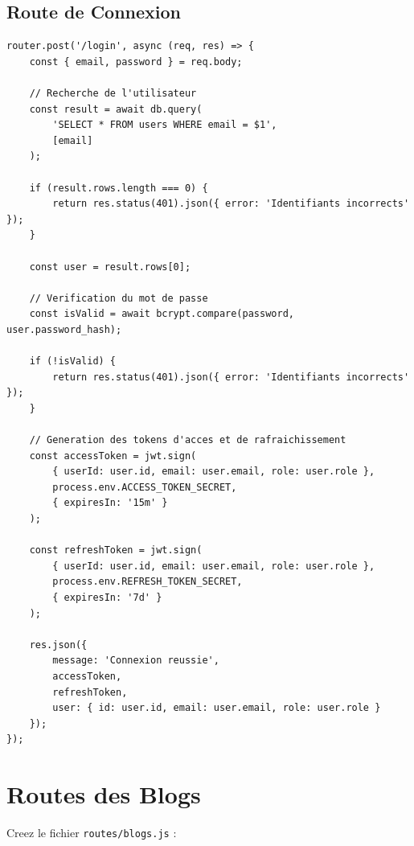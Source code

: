 \documentclass[a4paper,12pt]{book}
\begin{document}
\subsection{Route de Connexion}

\begin{lstlisting}[style=javascript, caption=POST /api/auth/login]
router.post('/login', async (req, res) => {
    const { email, password } = req.body;

    // Recherche de l'utilisateur
    const result = await db.query(
        'SELECT * FROM users WHERE email = $1',
        [email]
    );

    if (result.rows.length === 0) {
        return res.status(401).json({ error: 'Identifiants incorrects' });
    }

    const user = result.rows[0];

    // Verification du mot de passe
    const isValid = await bcrypt.compare(password, user.password_hash);

    if (!isValid) {
        return res.status(401).json({ error: 'Identifiants incorrects' });
    }

    // Generation des tokens d'acces et de rafraichissement
    const accessToken = jwt.sign(
        { userId: user.id, email: user.email, role: user.role },
        process.env.ACCESS_TOKEN_SECRET,
        { expiresIn: '15m' }
    );

    const refreshToken = jwt.sign(
        { userId: user.id, email: user.email, role: user.role },
        process.env.REFRESH_TOKEN_SECRET,
        { expiresIn: '7d' }
    );

    res.json({
        message: 'Connexion reussie',
        accessToken,
        refreshToken,
        user: { id: user.id, email: user.email, role: user.role }
    });
});
\end{lstlisting}

\section{Routes des Blogs}

Creez le fichier \texttt{routes/blogs.js} :
\end{document}
